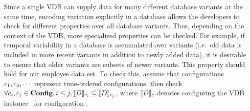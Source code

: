 \noindent
%
%
 Since a single VDB can supply data for many different database variants at the
 same time, encoding variation explicitly in a database allows the developers
 to check for different properties over all database variants.
%
Thus, depending on the context of the VDB, more specialized properties can be checked.
For example, if temporal variability in a database is accumulated over
variants (i.e.\ old data is included in more recent variants in addition to
newly added data), it is desirable to ensure that older variants are subsets of
newer variants.
%
This property should hold for our employee data set. To check this, 
assume that configurations \ensuremath{\config_1, \config_2, \cdots}
represent time-ordered configurations, then check
\ensuremath{
\forall \config_i, \config_j \in \confSet, i \le j, \sem[\config_i] {\vDB} \subseteq \sem[\config_j]{\vDB}
}, 
where \ensuremath{\sem[\config]{\vDB}} denotes configuring the VDB instance
\vDB\ for configuration \config. 



